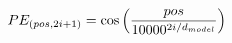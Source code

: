 \documentclass[preview]{standalone}
\begin{document}
\begin{align*}
\special{dvisvgm:raw <g id='unique000'>}PE_{(pos, 2i+1)} &= \cos\left(\frac{pos}{10000^{2i/d_{model}}}\right)\special{dvisvgm:raw </g>}
\end{align*}
\end{document}
